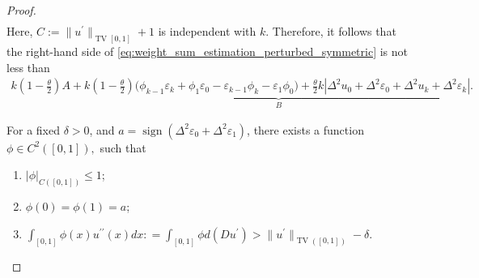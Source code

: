 \documentclass[10pt,a4paper]{amsart}
\begin{document}
\begin{proof}
\begin{equation}
\begin{aligned}
    \end{aligned}
\end{equation}
Here, $C := \|{u^\prime}\|_{\operatorname{TV}[0,1]} + 1$ is independent with $k$.
Therefore, it follows that the right-hand side of \eqref{eq:weight_sum_estimation_perturbed_symmetric} is not less than
\begin{equation}
    \begin{aligned}
k(1 - \frac{\theta}{2}) A + \underbrace{k(1-\frac{\theta}{2}) \Big(\phi_{k-1} \varepsilon_k+\phi_1 \varepsilon_0-\varepsilon_{k-1}\phi_k-\varepsilon_1\phi_0 \Big) + \frac \theta 2 k|\Delta^2 u_0+\Delta^2 \varepsilon_0 + \Delta^2 u_k+\Delta^2 \varepsilon_k|.}_B
    \end{aligned}
\end{equation}


For a fixed $\delta > 0$, and $a = \operatorname{sign}(\Delta^2 \varepsilon_0+\Delta^2\varepsilon_1)$,  there exists a function $\phi \in C^2([0,1]),$ such that
\begin{enumerate}
        \item[(a)] $|\phi|_{C([0,1])}\le 1$;
        \item[(b)] $\phi(0) = \phi(1)=a$;
        \item[(c)] $\int_{[0,1]} \phi(x) u^{\prime\prime}(x)dx: = \int_{[0,1]}\phi d(Du^\prime) > \|u^\prime\|_{\operatorname{TV}([0,1])}-\delta.$
    \end{enumerate}


\end{proof}
\end{document}
